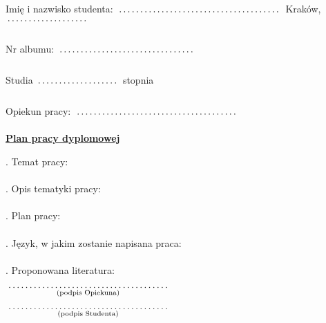 \documentclass[a4paper,8pt]{article}
\newcommand{\fillField}[2]{
    $\underset{\text{#1}}{\parbox[t]{#2}{\dotfill}}$
}
\begin{document}
\noindent
Imię i nazwisko studenta: \fillField{}{6cm} \hfill Kraków, \fillField{}{3cm}\\\\
Nr albumu:\fillField{}{5cm} \\\\
Studia \fillField{}{3cm} stopnia\\\\
Opiekun pracy: \fillField{}{6cm}\\


\vskip 2.0cm

\begin{center}
{\Large \underline{\textbf{Plan pracy dyplomowej}}}
\end{center}

\vskip 0.5cm

. Temat pracy: \\

\noindent
\null  \\

. Opis tematyki pracy: \\

\noindent
\null  \\

. Plan pracy: \\

\noindent
\null  \\

. Język, w jakim zostanie napisana praca: \\

\noindent
\null  \\

. Proponowana literatura:  \\

\vskip 2.0cm

\null\hfill\fillField{(podpis Opiekuna)}{6cm}%

\vskip 2.0cm

\null\hfill\fillField{(podpis Studenta)}{6cm}%

\vskip 4.0cm
\end{document}
